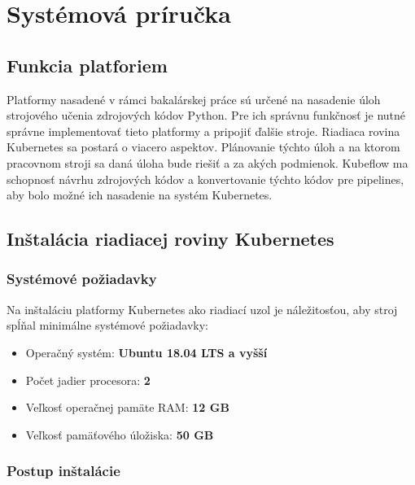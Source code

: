 
\chapter{Systémová príručka}

\section{Funkcia platforiem}

Platformy nasadené v rámci bakalárskej práce sú určené na nasadenie úloh strojového učenia zdrojových kódov Python. Pre ich správnu funkčnosť je nutné správne implementovať tieto platformy a pripojiť ďalšie stroje. Riadiaca rovina Kubernetes sa postará o viacero aspektov. Plánovanie týchto úloh a na ktorom pracovnom stroji sa daná úloha bude riešiť a za akých podmienok. Kubeflow ma schopnosť návrhu zdrojových kódov a konvertovanie týchto kódov pre pipelines, aby bolo možné ich nasadenie na systém Kubernetes.

\section{Inštalácia riadiacej roviny Kubernetes}

\subsection*{Systémové požiadavky}

Na inštaláciu platformy Kubernetes ako riadiací uzol je náležitosťou, aby stroj spĺňal minimálne systémové požiadavky:

\begin{itemize}
    \item Operačný systém: \textbf{Ubuntu 18.04 LTS a vyšší}
	\item Počet jadier procesora: \textbf{2}
    \item Veľkosť operačnej pamäte RAM: \textbf{12 GB}
    \item Veľkosť pamäťového úložiska: \textbf{50 GB}
\end{itemize}

\subsection*{Postup inštalácie}
\label{sec:hello}

